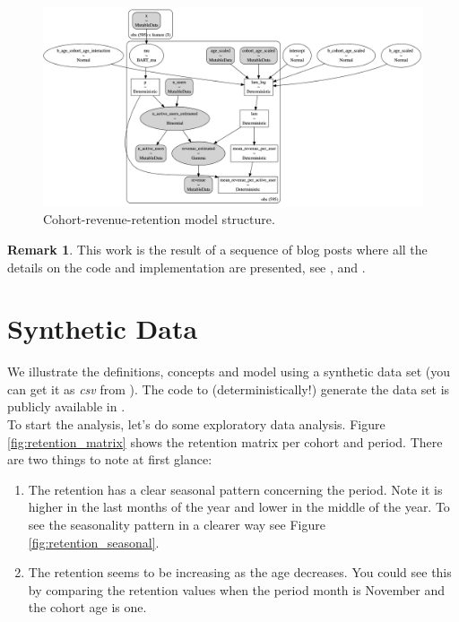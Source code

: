 \documentclass[11pt]{amsart}
\theoremstyle{definition}
\newtheorem{remark}{Remark}
\begin{document}
\begin{figure}
    \centering
    \includegraphics[width=\textwidth]{images/revenue_retention_33_0.png}
    \caption{Cohort-revenue-retention model structure.}
    \label{fig:revenue_retention_model}
\end{figure}


\begin{remark}
This work is the result of a sequence of blog posts where all the details on the code
and implementation are presented, see \cite{orduz_retention},
\cite{orduz_retention_bart} and \cite{orduz_revenue_retention}.  
\end{remark}


\section{Synthetic Data}

We illustrate the definitions, concepts and model using a synthetic data set (you can
get it as {\em csv} from \cite{orduz_revenue_retention_data}). The code to
(deterministically!) generate the data set is publicly available in 
\cite{orduz_revenue_retention_data_code}. \\

To start the analysis, let's do some exploratory data analysis. Figure
\ref{fig:retention_matrix} shows the retention matrix per cohort and period. There are 
two things to note at first glance:

\begin{enumerate}
    \item The retention has a clear seasonal pattern concerning the period. Note it is 
        higher in the last months of the year and lower in the middle of the year. To 
        see the seasonality pattern in a clearer way see Figure 
        \ref{fig:retention_seasonal}.
    \item The retention seems to be increasing as the age decreases. You could see this
    by comparing the retention values when the period month is November and the cohort
    age is one.
\end{enumerate}
\end{document}
